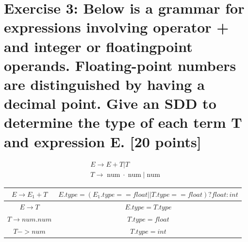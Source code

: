 \documentclass{article}
\begin{document}
    \section{Exercise 3: Below is a grammar for expressions involving operator + and integer or floatingpoint operands. Floating-point numbers are distinguished by having a decimal point. Give
    an SDD to determine the type of each term T and expression E. [20 points]}
    $$
        \begin{aligned} E \rightarrow E+T | T \\ T \rightarrow \operatorname{num} \cdot \operatorname{num} | \operatorname{num} \end{aligned}
    $$
    \begin{table}[!htbp]
        \centering
        \label{tab:aStrangeTable}
        \begin{tabular}{|c|c|}
            \hline
            $E\rightarrow E_1+T$ & $E.type = (E_1.type == float||T.type ==float)?float:int$\\
            \hline
            $E\rightarrow T$ & $E.type = T.type$ \\
            \hline
            $T\rightarrow num.num$ & $T.type = float$\\
            \hline
            $T->num$ & $T.type = int$\\
            \hline
            
        \end{tabular}
    \end{table}
    
\end{document}

